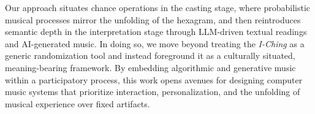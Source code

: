 \documentclass{article}
\begin{document}
Our approach situates chance operations in the casting stage, where probabilistic musical processes mirror the unfolding of the hexagram, and then reintroduces semantic depth in the interpretation stage through LLM-driven textual readings and AI-generated music. In doing so, we move beyond treating the \textit{I-Ching} as a generic randomization tool and instead foreground it as a culturally situated, meaning-bearing framework.  
By embedding algorithmic and generative music within a participatory process, this work opens avenues for designing computer music systems that prioritize interaction, personalization, and the unfolding of musical experience over fixed artifacts.


\end{document}
